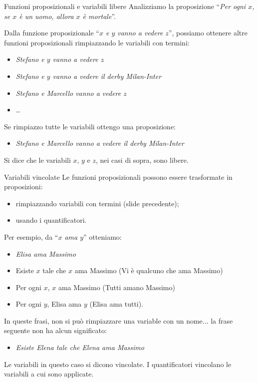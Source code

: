 \documentclass[10pt,dvipsnames]{beamer}
\begin{document}
\begin{frame}{Funzioni proposizionali e variabili libere}
	Analizziamo la proposizione ``{\itshape Per ogni $x$, se $x$ è un uomo, allora $x$ è mortale}''.

	\medskip

	\pause
	\medskip
	Dalla funzione proposizionale ``{\itshape $x$ e $y$ vanno a vedere $z$}'', possiamo ottenere altre funzioni proposizionali rimpiazzando le variabili con termini:
	\begin{itemize}
		\item {\itshape Stefano e $y$ vanno a vedere $z$}
		\item {\itshape Stefano e $y$ vanno a vedere il derby Milan-Inter}
		\item {\itshape Stefano e Marcello vanno a vedere $z$}
		\item \ldots
	\end{itemize}
	Se rimpiazzo tutte le variabili ottengo una proposizione:
	\begin{itemize}
		\item {\itshape Stefano e Marcello vanno a vedere  il derby Milan-Inter}
	\end{itemize}
	Si dice che le variabili $x$, $y$ e $z$, nei casi di sopra, sono \alert{libere}.
\end{frame}

\begin{frame}{Variabili vincolate}
	Le funzioni proposizionali possono essere trasformate in proposizioni:
	\begin{itemize}
		\item rimpiazzando variabili con termini (slide precedente);
		\item usando i quantificatori.
	\end{itemize}
	Per esempio, da  ``{\itshape $x$ ama $y$}'' otteniamo:
	{\itshape
	\begin{itemize}
		\item \itshape Elisa ama Massimo\\
		\item Esiste $x$ tale che $x$ ama Massimo (Vi è qualcuno che ama Massimo)\\
		\item Per ogni $x$, $x$ ama Massimo (Tutti amano Massimo)\\
		\item Per ogni $y$, Elisa ama $y$ (Elisa ama tutti).
	\end{itemize}
	}
	In queste frasi, non si può rimpiazzare una variable con un nome... la frase seguente non ha alcun significato:
	\begin{itemize}
	\item {\itshape Esiste Elena tale che Elena ama Massimo}\\
	\end{itemize}
	Le variabili in questo caso si dicono \alert{vincolate}. I quantificatori \alert{vincolano} le variabili a cui sono applicate.
\end{frame}
\end{document}
